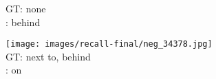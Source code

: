 \documentclass[10pt,twocolumn,letterpaper]{article}
\begin{document}
\begin{figure*}[t]
\begin{minipage}[b]{0.18\textwidth}
       	\vspace{0.2ex}
       	\small{
       	GT: none\\
       	\cite{Lu16}: behind
       	}
       	\vspace{0.3ex}
    \end{minipage}
    \hspace{0.005\textwidth}  
    \begin{minipage}[b]{0.18\textwidth}
    	\centering
       	\texttt{[image: images/recall-final/neg\_34378.jpg]}\\
       	\vspace{0.2ex}
       	\small{
       	GT: next to, behind\\
       	\cite{Lu16}: on
       	}
      	\vspace{0.3ex}
    \end{minipage} 
    

\end{figure*}
\end{document}
